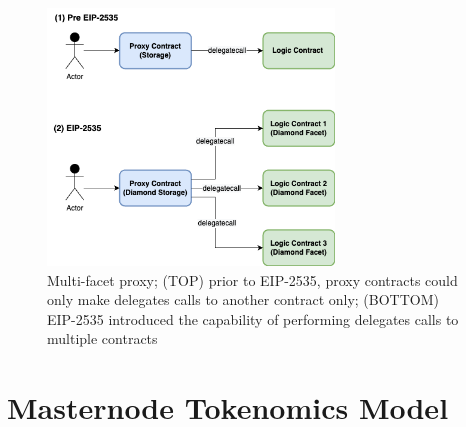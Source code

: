 \documentclass[journal,twocolumn,12pt]{ieeesyscoin}
\begin{document}
\begin{figure}[h!]
\includegraphics[width=3in]{img/diamonds.png}
\caption{Multi-facet proxy; (TOP) prior to EIP-2535, proxy contracts could only make delegates calls to another contract only; (BOTTOM) EIP-2535 introduced the capability of performing delegates calls to multiple contracts} 
\label{fig:diamonds}
\end{figure} 

\section{Masternode Tokenomics Model}
\label{sec:masternode_tokenomics}
\end{document}
